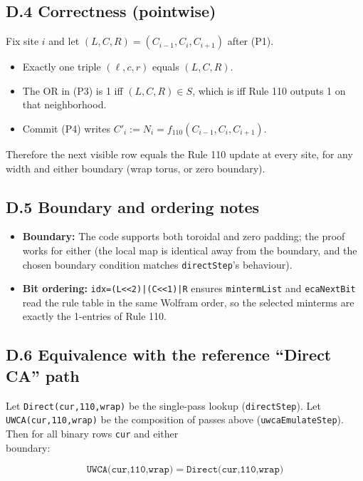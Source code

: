 \documentclass[12pt]{article}
\numberwithin{equation}{section}
\begin{document}
\subsection*{D.4  Correctness (pointwise)}

Fix site $i$ and let $(L,C,R)=(C_{i-1},C_i,C_{i+1})$ after (P1).
\begin{itemize}[leftmargin=1.1em]
  \item Exactly one triple $(\ell,c,r)$ equals $(L,C,R)$.
  \item The OR in (P3) is 1 iff $(L,C,R)\in S$, which is iff Rule 110 outputs 1 on that neighborhood.
  \item Commit (P4) writes $C'_i := N_i = f_{110}(C_{i-1},C_i,C_{i+1})$.
\end{itemize}

Therefore the next visible row equals the Rule 110 update at every site, for any width and either boundary (wrap torus, or zero boundary).

\subsection*{D.5  Boundary and ordering notes}
\begin{itemize}[leftmargin=1.1em]
  \item \textbf{Boundary:} The code supports both toroidal and zero padding; the proof works for either (the local map is identical away from the boundary, and the chosen boundary condition matches \texttt{directStep}'s behaviour).
  \item \textbf{Bit ordering:} \texttt{idx=(L<<2)|(C<<1)|R} ensures \texttt{mintermList} and \texttt{ecaNextBit} read the rule table in the same Wolfram order, so the selected minterms are exactly the 1-entries of Rule 110.
\end{itemize}

\subsection*{D.6  Equivalence with the reference ``Direct CA'' path}

Let \texttt{Direct(cur,110,wrap)} be the single-pass lookup (\texttt{directStep}). Let \texttt{UWCA(cur,110,wrap)} be the composition of passes above (\texttt{uwcaEmulateStep}). Then for all binary rows \texttt{cur} and either\\ boundary:

\[
\boxed{\ \texttt{UWCA(cur,110,wrap)} \;=\; \texttt{Direct(cur,110,wrap)} \ }
\]
\end{document}
